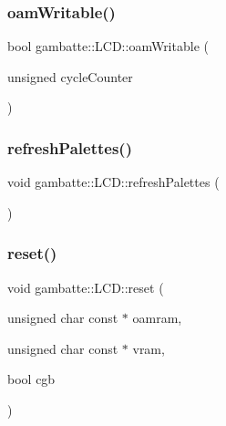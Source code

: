 \mbox{\label{classgambatte_1_1LCD_af0aafdd260473bbe749518838150240c}} 
\subsubsection{\texorpdfstring{oam\+Writable()}{oamWritable()}}
{\footnotesize\ttfamily bool gambatte\+::\+L\+C\+D\+::oam\+Writable (\begin{DoxyParamCaption}\item[{unsigned}]{cycle\+Counter }\end{DoxyParamCaption})}

\mbox{\label{classgambatte_1_1LCD_ae817caaa14358539b2a72df56af221d3}} 
\subsubsection{\texorpdfstring{refresh\+Palettes()}{refreshPalettes()}}
{\footnotesize\ttfamily void gambatte\+::\+L\+C\+D\+::refresh\+Palettes (\begin{DoxyParamCaption}{ }\end{DoxyParamCaption})\hspace{0.3cm}{\ttfamily [private]}}

\mbox{\label{classgambatte_1_1LCD_a91d74117a2d391d7fab9edc40083531b}} 
\subsubsection{\texorpdfstring{reset()}{reset()}}
{\footnotesize\ttfamily void gambatte\+::\+L\+C\+D\+::reset (\begin{DoxyParamCaption}\item[{unsigned char const $\ast$}]{oamram,  }\item[{unsigned char const $\ast$}]{vram,  }\item[{bool}]{cgb }\end{DoxyParamCaption})}


